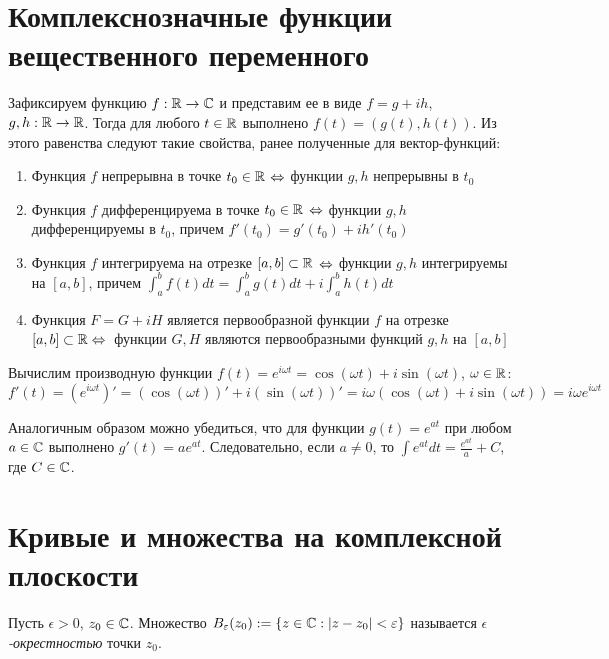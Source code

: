 \section{Комплекснозначные функции вещественного переменного}

\begin{note}
	Зафиксируем функцию $f : \mathbb{R} \to \mathbb{C}$ и представим ее в виде $f = g + ih$, $g, h : \mathbb{R} \to \mathbb{R}$. Тогда для любого $t \in \mathbb{R}$ выполнено $f(t) = (g(t), h(t))$. Из этого равенства следуют такие свойства, ранее полученные для вектор-функций:
	\begin{enumerate}
		\item Функция $f$ непрерывна в точке $t_0 \in \mathbb{R}$ $\Leftrightarrow$ функции $g, h$ непрерывны в $t_0$
		\item Функция $f$ дифференцируема в точке $t_0 \in \mathbb{R}$ $\Leftrightarrow$ функции $g, h$ дифференцируемы в $t_0$, причем $f'(t_0) = g'(t_0) + ih'(t_0)$
		\item Функция $f$ интегрируема на отрезке $[a, b] \subset \mathbb{R}$ $\Leftrightarrow$ функции $g, h$ интегрируемы на $[a, b]$, причем $\int_a^bf(t)dt = \int_a^bg(t)dt + i\int_a^bh(t)dt$
		\item Функция $F = G + iH$ является первообразной функции $f$ на отрезке $[a, b] \subset \R \hm\lra$~функции $G, H$ являются первообразными функций $g, h$ на $[a, b]$
	\end{enumerate}
\end{note}

\begin{example}
	Вычислим производную функции $f(t) = e^{i\omega t} = \cos(\omega t) + i\sin(\omega t)$, $\omega \in \mathbb{R}$:
	\[f'(t) = \left(e^{i\omega t}\right)' = \left(\cos(\omega t)\right)' + i \left(\sin(\omega t)\right)' = i\omega(\cos(\omega t) + i\sin(\omega t)) = i\omega e^{i \omega t}\]
	
	Аналогичным образом можно убедиться, что для функции $g(t) = e^{at}$ при любом $a \in \mathbb{C}$ выполнено $g'(t) = ae^{at}$. Следовательно, если $a \ne 0$, то $\int e^{at}dt = \frac{e^{at}}{a} + C$, где $C \in \mathbb{C}$.
\end{example}

\section{Кривые и множества на комплексной плоскости}

\begin{definition}
	Пусть $\epsilon > 0$, $z_0 \in \mathbb{C}$. Множество $B_{\varepsilon}(z_0) := \{z \in \mathbb{C}: |z - z_0| < \varepsilon\}$ называется \textit{$\epsilon$-окрестностью} точки $z_0$.
\end{definition}

